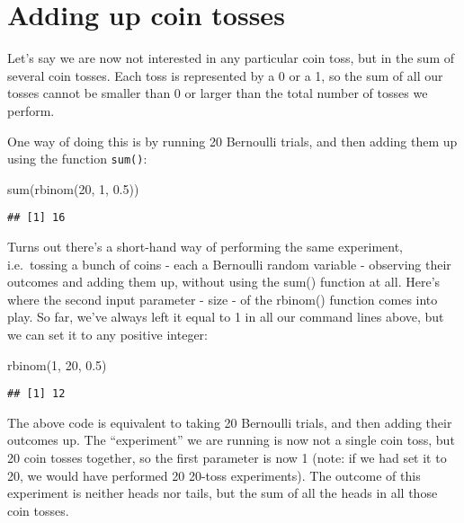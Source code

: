 \documentclass[
]{book}
\newenvironment{Shaded}{\begin{snugshade}}{\end{snugshade}}
\newcommand{\DecValTok}[1]{\textcolor[rgb]{0.00,0.00,0.81}{#1}}
\newcommand{\FloatTok}[1]{\textcolor[rgb]{0.00,0.00,0.81}{#1}}
\newcommand{\FunctionTok}[1]{\textcolor[rgb]{0.00,0.00,0.00}{#1}}
\newcommand{\NormalTok}[1]{#1}
\begin{document}
\hypertarget{adding-up-coin-tosses}{%
\section{Adding up coin tosses}\label{adding-up-coin-tosses}}

Let's say we are now not interested in any particular coin toss, but in the sum of several coin tosses. Each toss is represented by a 0 or a 1, so the sum of all our tosses cannot be smaller than 0 or larger than the total number of tosses we perform.

One way of doing this is by running 20 Bernoulli trials, and then adding them up using the function \texttt{sum()}:

\begin{Shaded}
\begin{Highlighting}[]
\FunctionTok{sum}\NormalTok{(}\FunctionTok{rbinom}\NormalTok{(}\DecValTok{20}\NormalTok{, }\DecValTok{1}\NormalTok{, }\FloatTok{0.5}\NormalTok{))}
\end{Highlighting}
\end{Shaded}

\begin{verbatim}
## [1] 16
\end{verbatim}

Turns out there's a short-hand way of performing the same experiment, i.e.~tossing a bunch of coins - each a Bernoulli random variable - observing their outcomes and adding them up, without using the sum() function at all. Here's where the second input parameter - size - of the rbinom() function comes into play. So far, we've always left it equal to 1 in all our command lines above, but we can set it to any positive integer:

\begin{Shaded}
\begin{Highlighting}[]
\FunctionTok{rbinom}\NormalTok{(}\DecValTok{1}\NormalTok{, }\DecValTok{20}\NormalTok{, }\FloatTok{0.5}\NormalTok{)}
\end{Highlighting}
\end{Shaded}

\begin{verbatim}
## [1] 12
\end{verbatim}

The above code is equivalent to taking 20 Bernoulli trials, and then adding their outcomes up. The ``experiment'' we are running is now not a single coin toss, but 20 coin tosses together, so the first parameter is now 1 (note: if we had set it to 20, we would have performed 20 20-toss experiments). The outcome of this experiment is neither heads nor tails, but the sum of all the heads in all those coin tosses.
\end{document}
